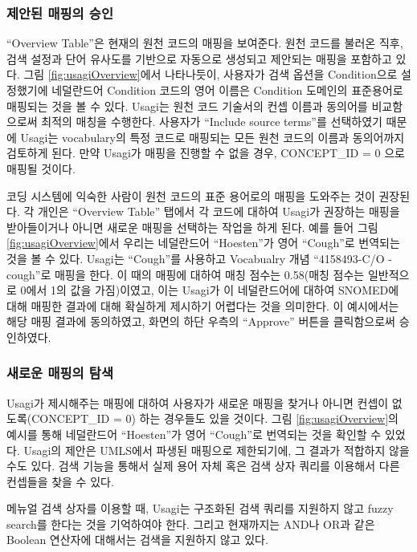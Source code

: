 \documentclass[11pt]{book}
\theoremstyle{definition}
\theoremstyle{definition}
\theoremstyle{definition}
\theoremstyle{remark}
\begin{document}
\subsubsection*{제안된 매핑의 승인}\label{--}

``Overview Table''은 현재의 원천 코드의 매핑을 보여준다. 원천 코드를
불러온 직후, 검색 설정과 단어 유사도를 기반으로 자동으로 생성되고
제안되는 매핑을 포함하고 있다. 그림 \ref{fig:usagiOverview}에서
나타나듯이, 사용자가 검색 옵션을 Condition으로 설정했기에 네덜란드어
Condition 코드의 영어 이름은 Condition 도메인의 표준용어로 매핑되는 것을
볼 수 있다. Usagi는 원천 코드 기술서의 컨셉 이름과 동의어를 비교함으로써
최적의 매칭을 수행한다. 사용자가 ``Include source terms''를 선택하였기
때문에 Usagi는 vocabulary의 특정 코드로 매핑되는 모든 원천 코드의 이름과
동의어까지 검토하게 된다. 만약 Usagi가 매핑을 진행할 수 없을 경우,
CONCEPT\_ID = 0 으로 매핑될 것이다.

코딩 시스템에 익숙한 사람이 원천 코드의 표준 용어로의 매핑을 도와주는
것이 권장된다. 각 개인은 ``Overview Table'' 탭에서 각 코드에 대하여
Usagi가 권장하는 매핑을 받아들이거나 아니면 새로운 매핑을 선택하는
작업을 하게 된다. 예를 들어 그림 \ref{fig:usagiOverview}에서 우리는
네덜란드어 ``Hoesten''가 영어 ``Cough''로 번역되는 것을 볼 수 있다.
Usagi는 ``Cough''를 사용하고 Vocabualry 개념 ``4158493-C/O - cough''로
매핑을 한다. 이 때의 매핑에 대하여 매칭 점수는 0.58(매칭 점수는
일반적으로 0에서 1의 값을 가짐)이였고, 이는 Usagi가 이 네덜란드어에
대하여 SNOMED에 대해 매핑한 결과에 대해 확실하게 제시하기 어렵다는 것을
의미한다. 이 예시에서는 해당 매핑 결과에 동의하였고, 화면의 하단 우측의
``Approve'' 버튼을 클릭함으로써 승인하였다.

\subsubsection*{새로운 매핑의 탐색}\label{--}

Usagi가 제시해주는 매핑에 대하여 사용자가 새로운 매핑을 찾거나 아니면
컨셉이 없도록(CONCEPT\_ID = 0) 하는 경우들도 있을 것이다. 그림
\ref{fig:usagiOverview}의 예시를 통해 네덜란드어 ``Hoesten''가 영어
``Cough''로 번역되는 것을 확인할 수 있었다. Usagi의 제안은 UMLS에서
파생된 매핑으로 제한되기에, 그 결과가 적합하지 않을 수도 있다. 검색
기능을 통해서 실제 용어 자체 혹은 검색 상자 쿼리를 이용해서 다른
컨셉들을 찾을 수 있다.

메뉴얼 검색 상자를 이용할 때, Usagi는 구조화된 검색 쿼리를 지원하지 않고
fuzzy search를 한다는 것을 기억하여야 한다. 그리고 현재까지는 AND나 OR과
같은 Boolean 연산자에 대해서는 검색을 지원하지 않고 있다.
\end{document}
